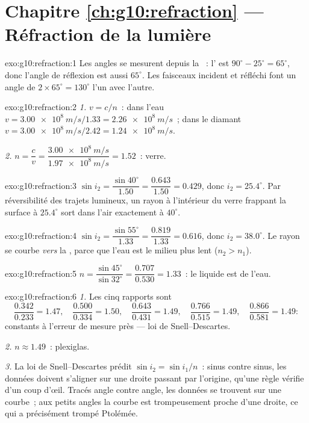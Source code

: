 \section*{Chapitre \ref{ch:g10:refraction} --- Réfraction de la lumière}

\begin{solution}{exo:g10:refraction:1}
Les angles se mesurent depuis la ~: l'
est $90^\circ - 25^\circ = 65^\circ$, donc l'angle de réflexion est
aussi $65^\circ$. Les faisceaux incident et réfléchi font un angle de
$2 \times 65^\circ = 130^\circ$ l'un avec l'autre.
\end{solution}

\begin{solution}{exo:g10:refraction:2}
\emph{1.} $v = c/n$~: dans l'eau
$v = \qty{3.00e8}{m/s}/1.33 = \qty{2.26e8}{m/s}$~; dans le diamant
$v = \qty{3.00e8}{m/s}/2.42 = \qty{1.24e8}{m/s}$.

\emph{2.} $n = \dfrac{c}{v} = \dfrac{\qty{3.00e8}{m/s}}
{\qty{1.97e8}{m/s}} = 1.52$~: verre.
\end{solution}

\begin{solution}{exo:g10:refraction:3}
$\sin i_2 = \dfrac{\sin 40^\circ}{1.50} = \dfrac{0.643}{1.50} = 0.429$,
donc $i_2 = 25.4^\circ$. Par réversibilité des trajets lumineux, un
rayon à l'intérieur du verre frappant la surface à $25.4^\circ$ sort
dans l'air exactement à $40^\circ$.
\end{solution}

\begin{solution}{exo:g10:refraction:4}
$\sin i_2 = \dfrac{\sin 55^\circ}{1.33} = \dfrac{0.819}{1.33} = 0.616$,
donc $i_2 = 38.0^\circ$. Le rayon se courbe \emph{vers} la
, parce que l'eau est le milieu plus lent ($n_2 > n_1$).
\end{solution}

\begin{solution}{exo:g10:refraction:5}
$n = \dfrac{\sin 45^\circ}{\sin 32^\circ} = \dfrac{0.707}{0.530}
= 1.33$~: le liquide est de l'eau.
\end{solution}

\begin{solution}{exo:g10:refraction:6}
\emph{1.} Les cinq rapports sont
\[
\frac{0.342}{0.233} = 1.47,\quad
\frac{0.500}{0.334} = 1.50,\quad
\frac{0.643}{0.431} = 1.49,\quad
\frac{0.766}{0.515} = 1.49,\quad
\frac{0.866}{0.581} = 1.49 :
\]
constants à l'erreur de mesure près --- loi de Snell--Descartes.

\emph{2.} $n \approx 1.49$~: plexiglas.

\emph{3.} La loi de Snell--Descartes prédit
$\sin i_2 = \sin i_1 / n$~: sinus contre sinus, les données doivent
s'aligner sur une droite passant par l'origine, qu'une règle vérifie
d'un coup d'œil. Tracés angle contre angle, les données se trouvent
sur une courbe~; aux petits angles la courbe est trompeusement proche
d'une droite, ce qui a précisément trompé Ptolémée.
\end{solution}

